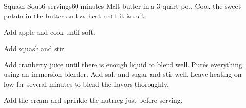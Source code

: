 \documentclass[../Cookbook.tex]{subfiles}
\begin{document}
\begin{recipe}{Squash Soup}{6 servings}{60 minutes}
Melt butter in a 3-quart pot. Cook the sweet potato in the butter on low heat until it is soft.

Add apple and cook until soft.

Add squash and stir.

Add cranberry juice until there is enough liquid to blend well. Pur\'ee everything using an immersion blender.
Add salt and sugar and stir well. Leave heating on low for several minutes to blend the flavors thoroughly.

Add the cream and sprinkle the nutmeg just before serving.

\end{recipe}
\end{document}
